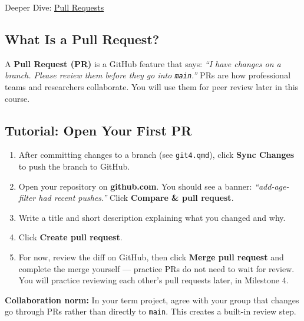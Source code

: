 \documentclass[
  letterpaper,
  DIV=11,
  numbers=noendperiod,
  oneside]{scrreprt}
\providecommand{\tightlist}{%
  \setlength{\itemsep}{0pt}\setlength{\parskip}{0pt}}
\begin{document}

Deeper Dive: \href{git05-pull-requests.qmd}{Pull Requests}

\subsection*{What Is a Pull Request?}\label{what-is-a-pull-request}

A \textbf{Pull Request (PR)} is a GitHub feature that says: \emph{``I
have changes on a branch. Please review them before they go into
\texttt{main}.''} PRs are how professional teams and researchers
collaborate. You will use them for peer review later in this course.

\subsection*{Tutorial: Open Your First
PR}\label{tutorial-open-your-first-pr}

\begin{enumerate}
\def\labelenumi{\arabic{enumi}.}
\tightlist
\item
  After committing changes to a branch (see \texttt{git4.qmd}), click
  \textbf{Sync Changes} to push the branch to GitHub.
\item
  Open your repository on \textbf{github.com}. You should see a banner:
  \emph{``add-age-filter had recent pushes.''} Click \textbf{Compare \&
  pull request}.
\item
  Write a title and short description explaining what you changed and
  why.
\item
  Click \textbf{Create pull request}.
\item
  For now, review the diff on GitHub, then click \textbf{Merge pull
  request} and complete the merge yourself --- practice PRs do not need
  to wait for review. You will practice reviewing each other's pull
  requests later, in Milestone 4.
\end{enumerate}

\begin{tcolorbox}[enhanced jigsaw, title=\textcolor{quarto-callout-tip-color}{\faLightbulb}\hspace{0.5em}{Tip}, arc=.35mm, toptitle=1mm, colframe=quarto-callout-tip-color-frame, toprule=.15mm, leftrule=.75mm, bottomtitle=1mm, opacityback=0, bottomrule=.15mm, coltitle=black, breakable, opacitybacktitle=0.6, titlerule=0mm, colback=white, left=2mm, colbacktitle=quarto-callout-tip-color!10!white, rightrule=.15mm]

\textbf{Collaboration norm:} In your term project, agree with your group
that changes go through PRs rather than directly to \texttt{main}. This
creates a built-in review step.

\end{tcolorbox}
\end{document}
